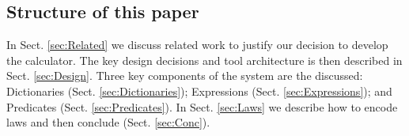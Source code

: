\subsection{Structure of this paper}

In Sect. \ref{sec:Related} we discuss related work
to justify our decision to develop the calculator.
The key design decisions and tool architecture is then described
in Sect. \ref{sec:Design}.
Three key components of the system are the discussed:
Dictionaries (Sect. \ref{sec:Dictionaries});
Expressions (Sect. \ref{sec:Expressions}); and
Predicates (Sect. \ref{sec:Predicates}).
In Sect. \ref{sec:Laws} we describe how to encode laws
and then conclude (Sect. \ref{sec:Conc}).
